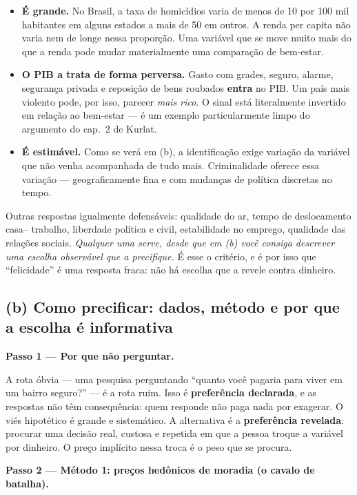 \documentclass[11pt, a4paper]{article}
\newcommand{\passo}[1]{\medskip\noindent\textbf{#1}\par\nobreak}
\begin{document}
\begin{itemize}
\item \textbf{É grande.} No Brasil, a taxa de homicídios varia de menos de 10 por 100 mil
      habitantes em alguns estados a mais de 50 em outros. A renda per capita não varia
      nem de longe nessa proporção. Uma variável que se move muito mais do que a renda
      pode mudar materialmente uma comparação de bem-estar.
\item \textbf{O PIB a trata de forma perversa.} Gasto com grades, seguro, alarme,
      segurança privada e reposição de bens roubados \textbf{entra} no PIB. Um país mais
      violento pode, por isso, parecer \emph{mais rico}. O sinal está literalmente
      invertido em relação ao bem-estar --- é um exemplo particularmente limpo do
      argumento do cap.\ 2 de Kurlat.
\item \textbf{É estimável.} Como se verá em (b), a identificação exige variação da
      variável que não venha acompanhada de tudo mais. Criminalidade oferece essa variação
      --- geograficamente fina e com mudanças de política discretas no tempo.
\end{itemize}

Outras respostas igualmente defensáveis: qualidade do ar, tempo de deslocamento casa--%
trabalho, liberdade política e civil, estabilidade no emprego, qualidade das relações
sociais. \emph{Qualquer uma serve, desde que em (b) você consiga descrever uma escolha
observável que a precifique.} É esse o critério, e é por isso que ``felicidade'' é uma
resposta fraca: não há escolha que a revele contra dinheiro.

\subsection*{(b) Como precificar: dados, método e por que a escolha é informativa}

\passo{Passo 1 --- Por que não perguntar.} A rota óbvia --- uma pesquisa perguntando
``quanto você pagaria para viver em um bairro seguro?'' --- é a rota ruim. Isso é
\textbf{preferência declarada}, e as respostas não têm consequência: quem responde não
paga nada por exagerar. O viés hipotético é grande e sistemático. A alternativa é a
\textbf{preferência revelada}: procurar uma decisão real, custosa e repetida em que a
pessoa troque a variável por dinheiro. O preço implícito nessa troca é o peso que se
procura.

\passo{Passo 2 --- Método 1: preços hedônicos de moradia (o cavalo de batalha).}
\end{document}

